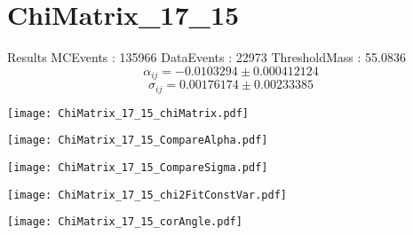\documentclass[a4paper,12pt]{article}
\begin{document}
\section{ChiMatrix\_17\_15}
\begin{minipage}{0.49\linewidth} Results \newline
MCEvents : 135966\newline
DataEvents : 22973 \newline
ThresholdMass : 55.0836\\
$$\alpha_{ij} = -0.0103294\pm 0.000412124$$
$$\sigma_{ij} = 0.00176174\pm 0.00233385$$
\end{minipage}\hfill
\begin{minipage}{0.49\linewidth} 
\texttt{[image: ChiMatrix\_17\_15\_chiMatrix.pdf]}\\
\end{minipage}
\hfill
\begin{minipage}{0.49\linewidth} 
\texttt{[image: ChiMatrix\_17\_15\_CompareAlpha.pdf]}\\
\end{minipage}
\hfill
\begin{minipage}{0.49\linewidth} 
\texttt{[image: ChiMatrix\_17\_15\_CompareSigma.pdf]}\\
\end{minipage}
\begin{minipage}{0.49\linewidth} 
\texttt{[image: ChiMatrix\_17\_15\_chi2FitConstVar.pdf]}\\
\end{minipage}
\hfill
\begin{minipage}{0.49\linewidth} 
\texttt{[image: ChiMatrix\_17\_15\_corAngle.pdf]}\\
\end{minipage}
\end{document}
